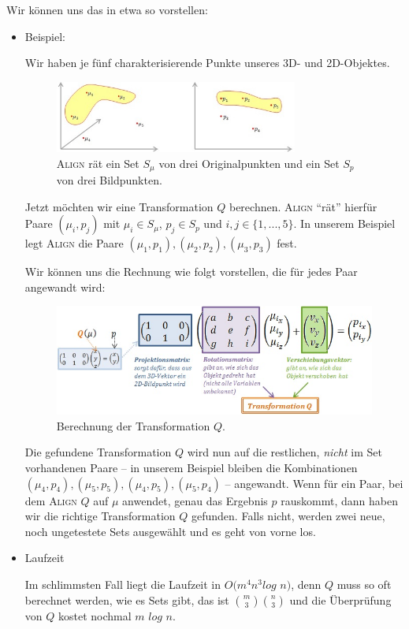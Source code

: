 Wir können uns das in etwa so vorstellen:
\begin{itemize}
\item Beispiel:

Wir haben je fünf charakterisierende Punkte unseres 3D- und 2D-Objektes.
\begin{figure}[h]
\centering
\includegraphics[width=8cm]{chapters/computervision/grafik_11_set.jpg}
\caption{\textsc{Align} rät ein Set $S_\mu$ von drei Originalpunkten und ein Set $S_p$ von drei Bildpunkten.}
\label{fig:11}
\end{figure}

Jetzt möchten wir eine Transformation $Q$ berechnen. \textsc{Align} "`rät"' hierfür Paare $(\mu_i,p_j)$ mit $\mu_i\in S_\mu$, $p_j\in S_p$ und $i,j\in\{1,...,5\}$. In unserem Beispiel legt \textsc{Align} die Paare $(\mu_1,p_1), (\mu_2,p_2), (\mu_3,p_3)$ fest.

Wir können uns die Rechnung wie folgt vorstellen, die für jedes Paar angewandt wird:
\begin{figure}[h]
\centering
\includegraphics[width=12cm]{chapters/computervision/grafik_12_q.jpg}
\caption{Berechnung der Transformation $Q$.}
\label{fig:12}
\end{figure}

Die gefundene Transformation $Q$ wird nun auf die restlichen, \textit{nicht} im Set vorhandenen Paare -- in unserem Beispiel bleiben die Kombinationen $(\mu_4,p_4), (\mu_5,p_5), (\mu_4,p_5), (\mu_5,p_4)$ -- angewandt. Wenn für ein Paar, bei dem \textsc{Align} $Q$ auf $\mu$ anwendet, genau das Ergebnis $p$ rauskommt, dann haben wir die richtige Transformation $Q$ gefunden. Falls nicht, werden zwei neue, noch ungetestete Sets ausgewählt und es geht von vorne los.
\item Laufzeit

Im schlimmsten Fall liegt die Laufzeit in $O(m^4n^3log$ $n)$, denn $Q$ muss so oft berechnet werden, wie es Sets gibt, das ist $\binom{m}{3}\binom{n}{3}$ und die Überprüfung von $Q$ kostet nochmal $m$ $log$ $n$.


\end{itemize}
